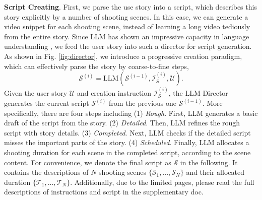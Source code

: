 \textbf{Script Creating}.
First,
we parse the use story into a script,
which describes this story explicitly by a number of shooting scenes.
In this case,
we can generate a video snippet for each shooting scene,
instead of learning a long video tediously from the entire story.
Since LLM has shown an impressive capacity in language understanding \cite{brown2020language, Zeng2022GLM130BAO, Touvron2023LLaMAOA, OpenAI2023GPT4TR, Sun2021ERNIE3L, Bai2023QwenTR, 2023internlm, Chowdhery2022PaLMSL},
we feed the user story into such a director for script generation.
As shown in Fig. \ref{fig:director},
we introduce a progressive creation paradigm,
which can effectively parse the story by coarse-to-fine steps,
\begin{equation}
\mathcal{S}^{(i)}=\text{LLM}(\mathcal{S}^{(i-1)},\mathcal{I}^{(i)}_{S},\mathcal{U}).
\label{eq:script}    
\end{equation}
Given the user story $\mathcal{U}$ and creation instruction $\mathcal{I}^{(i)}_{S}$,
the LLM Director generates the current script $\mathcal{S}^{(i)}$ from the previous one $\mathcal{S}^{(i-1)}$.
More specifically,
there are four steps including
(1) \textit{Rough}.
First,
LLM generates a basic draft of the script from the story.
(2) \textit{Detailed}.
Then,
LLM refines the rough script with story details.
(3) \textit{Completed}.
Next,
LLM checks if the detailed script misses the important parts of the story. 
(4) \textit{Scheduled}.
Finally,
LLM allocates a shooting duration for each scene in the completed script,
according to the scene content.
For convenience,
we denote the final script as $\mathcal{S}$ in the following.
It contains the descriptions of $N$ shooting scenes $\{\mathcal{S}_{1},...,\mathcal{S}_{N}\}$ and their allocated duration $\{\mathcal{T}_{1},...,\mathcal{T}_{N}\}$.
Additionally,
due to the limited pages,
please read the full descriptions of instructions and script in the supplementary doc.


